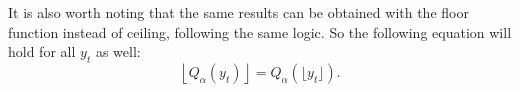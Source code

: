 \documentclass[]{elsarticle} %
\begin{document}
It is also worth noting that the same results can be obtained with the
floor function instead of ceiling, following the same logic. So the
following equation will hold for all \(y_t\) as well:
\begin{equation} \label{eq:floorAndQuantiles1}
    \left \lfloor Q_\alpha(y_t) \right \rfloor = Q_\alpha \left(\lfloor y_t \rfloor \right) .
\end{equation}

\renewcommand\refname{References}

\end{document}

